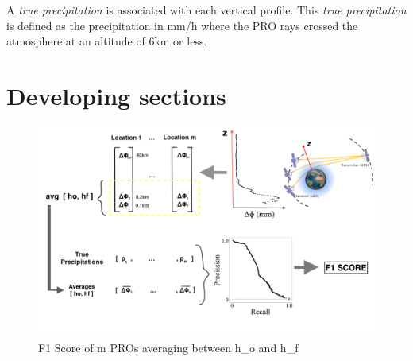 \documentclass[twocolumn]{revtex4}
\begin{document}
A {\it true precipitation} is associated with each vertical profile. This {\it true precipitation} 
is defined as the precipitation in mm/h where the PRO rays crossed the atmosphere
at an altitude of 6km or less. 


\section{Developing sections}


\begin{figure}[h!]
    \includegraphics[scale=0.2]{map.png}
    \caption{F1 Score of m PROs averaging between {h_o} and {h_f}}
    \label{fig:sample}
    \end{figure}
\end{document}
